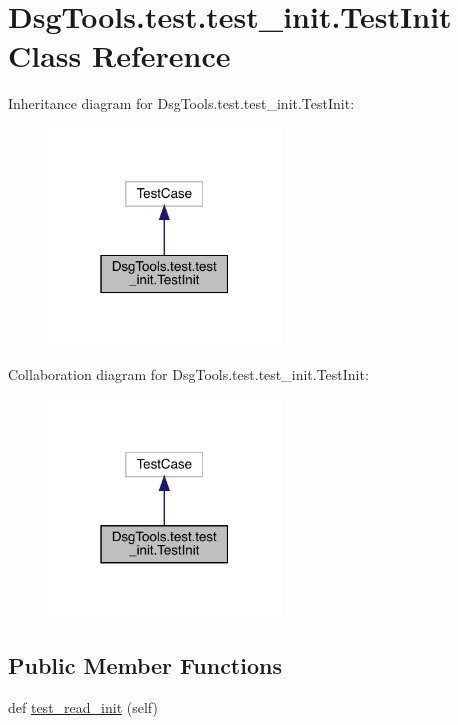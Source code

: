 \hypertarget{class_dsg_tools_1_1test_1_1test__init_1_1_test_init}{}\section{Dsg\+Tools.\+test.\+test\+\_\+init.\+Test\+Init Class Reference}
\label{class_dsg_tools_1_1test_1_1test__init_1_1_test_init}


Inheritance diagram for Dsg\+Tools.\+test.\+test\+\_\+init.\+Test\+Init\+:
\nopagebreak
\begin{figure}[H]
\begin{center}
\leavevmode
\includegraphics[width=175pt]{class_dsg_tools_1_1test_1_1test__init_1_1_test_init__inherit__graph}
\end{center}
\end{figure}


Collaboration diagram for Dsg\+Tools.\+test.\+test\+\_\+init.\+Test\+Init\+:
\nopagebreak
\begin{figure}[H]
\begin{center}
\leavevmode
\includegraphics[width=175pt]{class_dsg_tools_1_1test_1_1test__init_1_1_test_init__coll__graph}
\end{center}
\end{figure}
\subsection*{Public Member Functions}
\begin{DoxyCompactItemize}
\item 
def \mbox{\hyperlink{class_dsg_tools_1_1test_1_1test__init_1_1_test_init_a95b5963fc0b5cc9e50df2adfbd5cd282}{test\+\_\+read\+\_\+init}} (self)
\end{DoxyCompactItemize}


